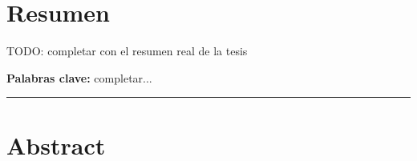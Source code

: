 \chapter*{Resumen}

% 
TODO: completar con el resumen real de la tesis



\bigskip
\noindent\textbf{Palabras clave:} completar...%

\bigskip
\hrule
\bigskip

\chapter*{Abstract}

